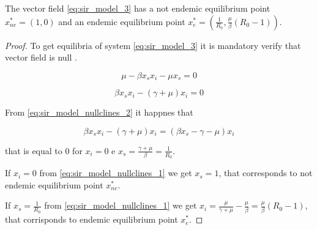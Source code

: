 \begin{theorem}
\label{th:sir_equilibria}
The vector field \ref{eq:sir_model_3} has a not endemic equilibrium point $x_{ne}^* = (1,0)$ and an endemic equilibrium point $x_e^*=(\frac{1}{R_0}, \frac{\mu}{\beta} (R_0 - 1))$.
\end{theorem}

\begin{proof}
To get equilibria of system \ref{eq:sir_model_3} it is mandatory verify that vector field is null \cite[p. 3]{bib:khalil}.

\begin{equation}
\label{eq:sir_model_nullclines_1}
         \mu - \beta x_sx_i - \mu x_s = 0
\end{equation}

\begin{equation}
\label{eq:sir_model_nullclines_2}
         \beta x_sx_i - (\gamma + \mu)x_i = 0
\end{equation}

From \ref{eq:sir_model_nullclines_2} it happnes that

\begin{equation}
\label{eq:sir_model_nullclines_2_demonstation}
         \beta x_sx_i - (\gamma + \mu)x_i = (\beta x_s -\gamma - \mu)x_i
\end{equation}

that is equal to 0 for $x_i = 0$ e $x_s = \frac{\gamma + \mu}{\beta}=\frac{1}{R_0}$.

If $x_i = 0$ from \ref{eq:sir_model_nullclines_1} we get $x_s = 1$, that corresponds to not endemic equilibrium point $x_{ne}^*$.

If $x_s = \frac{1}{R_0}$ from \ref{eq:sir_model_nullclines_1} we get $x_i=\frac{\mu}{\gamma + \mu} - \frac{\mu}{\beta} = \frac{\mu}{\beta} (R_0 - 1)$, that corrisponds to endemic equilibrium point $x_e^*$.
\end{proof}